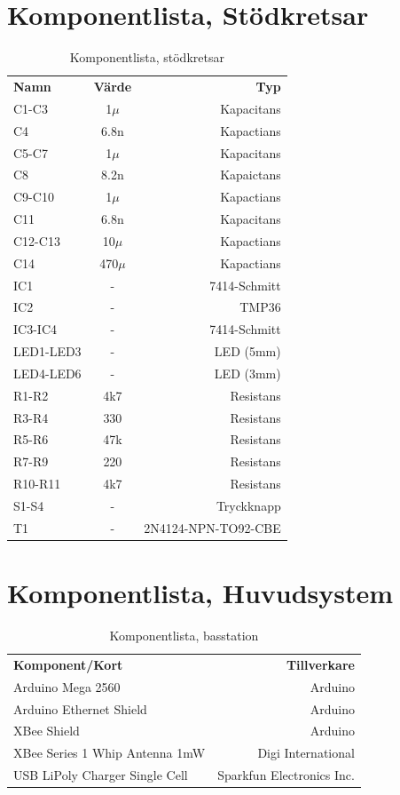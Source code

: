 \documentclass[a4paper,11pt]{article}
\begin{document}
\section{Komponentlista, Stödkretsar}

\begin{table}[h]
\centering
	\begin{tabular}{|l|c|r|}
	{\bf Namn} & {\bf Värde} & {\bf Typ} \\
	C1-C3			& 1$\mu$	& Kapacitans \\
	C4			& 6.8n		& Kapactians \\		
	C5-C7			& 1$\mu$	& Kapacitans \\
	C8			& 8.2n		& Kapaictans \\
	C9-C10			& 1$\mu$	& Kapactians \\
	C11			& 6.8n		& Kapacitans \\
	C12-C13			& 10$\mu$	& Kapactians \\
	C14			& 470$\mu$	& Kapactians \\
	IC1			& -		& 7414-Schmitt \\
	IC2			& -		& TMP36 \\
	IC3-IC4			& -		& 7414-Schmitt \\
	LED1-LED3		& -		& LED (5mm) \\
	LED4-LED6		& -		& LED (3mm) \\
	R1-R2			& 4k7		& Resistans \\
	R3-R4			& 330		& Resistans \\
	R5-R6			& 47k		& Resistans \\
	R7-R9			& 220		& Resistans \\
	R10-R11			& 4k7		& Resistans \\
	S1-S4			& -		& Tryckknapp \\
	T1                      & -		& 2N4124-NPN-TO92-CBE \\
	\end{tabular}
\caption{Komponentlista, stödkretsar}
\label{tab:komponenttable}
\end{table}
\pagebreak

\section{Komponentlista, Huvudsystem}

\begin{table}[h]
\centering
	\begin{tabular}{|l|r|}
	{\bf Komponent/Kort} & {\bf Tillverkare} \\
	Arduino Mega 2560                  & Arduino \\
	Arduino Ethernet Shield            & Arduino \\
	XBee Shield                        & Arduino \\
	XBee Series 1 Whip Antenna 1mW     & Digi International \\
	USB LiPoly Charger Single Cell     & Sparkfun Electronics Inc. \\
	\end{tabular}
\caption{Komponentlista, basstation}
\label{tab:korttable_bas}
\end{table}
\pagebreak
\end{document}
